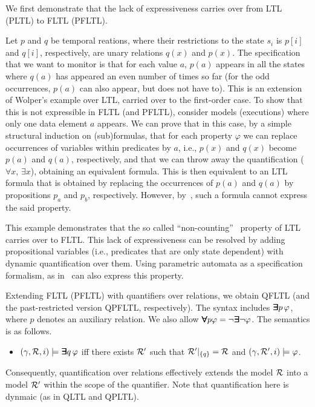 
We first demonstrate that the lack of expressiveness
carries over from LTL (PLTL) to FLTL (PFLTL).

Let $p$ and $q$ be temporal reations, where their
restrictions to the state $s_i$ is $p[i]$ and $q[i]$, respectively, are unary relations $q(x)$ and $p(x)$. The
specification that we want to monitor is that for each value
$a$, $p(a)$ appears in all the states where $q(a)$ has appeared an even number of times so far (for the odd occurrences, $p(a)$ can also appear, but does not have to). This is an extension of
Wolper's example over LTL, carried over to the first-order case. To show that this is not expressible in FLTL (and PFLTL),
consider models (executions) where only one data element $a$ appears. We can prove that in this case, by a simple structural induction on (sub)formulas, that for each property $\varphi$
we can replace occurrences of variables within
predicates by $a$, i.e., $p(x)$ and $q(x)$ become $p(a)$
and $q  (a )$, respectively, and that we can throw away
the quantification ($\forall x$, $\exists x$), obtaining
an equivalent formula. This is then equivalent to
an LTL formula that is obtained by replacing
the occurrences of $p(a)$ and $q(a)$ by propositions
$p_a$ and $p_b$, respectively. However, by~\cite{Wolper},
such a formula cannot express the said property.

This example demonstrates that the so called ``non-counting''~\cite{Thomas} property of LTL carries over
to FLTL. This lack of expressiveness can be resolved by
adding propositional variables (i.e., predicates that are
only state dependent) with dynamic quantification over them.
Using parametric automata as a specification formalism, as in~\cite{Grum,havelund-rv-data-2018,Meredith2011,Reger2015} can also express this property.





Extending FLTL (PFLTL) with quantifiers over relations, we obtain QFLTL
(and the past-restricted version QPFLTL, respectively). 
The syntax includes $\bm{\exists}\kern-0.6em\bm{\exists} p \, \varphi$, 
where $p$ denotes an auxiliary relation.
We also allow $\bm{\forall}\kern-0.6em\bm{\forall} p \varphi = \neg \bm{\exists}\kern-0.6em\bm{\exists} \neg \varphi$. The semantics is as follows.





\begin{itemize}
\item $(\gamma ,  {\cal R}, i) \models \bm{\exists}\kern-0.6em\bm{\exists} q \, \varphi$ iff there exists
${\cal R}'$ such that ${\cal R}' |_{\{ q \} } = {\cal R}$ and 
$( \gamma, {\cal R}' , i) \models \varphi$.
\end{itemize}
Consequently, quantification over relations effectively extends the model ${\cal R}$ into a model ${\cal R}'$ within the scope of the quantifier. Note that quantification here is dynmaic (as in QLTL and QPLTL).


